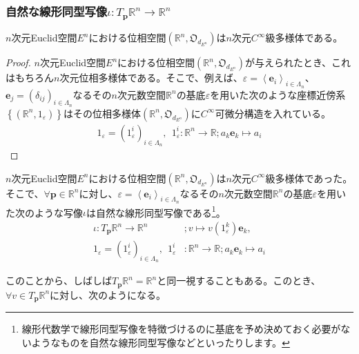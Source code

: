 \documentclass[dvipdfmx]{jsarticle}
\begin{document}
\subsubsection{自然な線形同型写像$\iota :T_{\mathbf{p}} \mathbb{R}^n \rightarrow \mathbb{R}^n $}
\begin{thm}\label{8.3.3.12}
  $n$次元Euclid空間$E^n$における位相空間$\left(\mathbb{R}^n ,\mathfrak{O}_{d_{E^n}}\right)$は$n$次元$C^\infty $級多様体である。
\end{thm}
\begin{proof}
  $n$次元Euclid空間$E^n$における位相空間$\left(\mathbb{R}^n ,\mathfrak{O}_{d_{E^n}}\right)$が与えられたとき、これはもちろん$n$次元位相多様体である。そこで、例えば、$\varepsilon =\left\langle \mathbf{e}_i \right\rangle_{i\in \varLambda_n } $、$\mathbf{e}_j =\left( \delta_{ij} \right)_{i\in \varLambda_n }$なるその$n$次元数空間$\mathbb{R}^n $の基底$\varepsilon$を用いた次のような座標近傍系$\left\{ \left(\mathbb{R}^n ,1_\varepsilon \right) \right\} $はその位相多様体$\left(\mathbb{R}^n ,\mathfrak{O}_{d_{E^n}}\right)$に$C^\infty $可微分構造を入れている。
  \begin{align*}
    1_\varepsilon =\left( 1_\varepsilon^i \right)_{i\in \varLambda_n },\ \ 1_\varepsilon^i :\mathbb{R}^n \rightarrow \mathbb{R} ;a_k \mathbf{e}_k \mapsto a_i 
  \end{align*}
\end{proof}
\begin{thm}\label{8.3.3.13}
  $n$次元Euclid空間$E^n$における位相空間$\left(\mathbb{R}^n ,\mathfrak{O}_{d_{E^n}}\right)$は$n$次元$C^\infty $級多様体であった。そこで、$\forall \mathbf{p} \in \mathbb{R}^n $に対し、$\varepsilon =\left\langle \mathbf{e}_i \right\rangle_{i\in \varLambda_n } $なるその$n$次元数空間$\mathbb{R}^n $の基底$\varepsilon$を用いた次のような写像$\iota $は自然な線形同型写像である\footnote{線形代数学で線形同型写像を特徴づけるのに基底を予め決めておく必要がないようなものを自然な線形同型写像などといったりします。}。
  \begin{align*}
    \iota :T_\mathbf{p} \mathbb{R}^n \rightarrow \mathbb{R}^n &;v\mapsto v\left(1_\varepsilon^k \right) \mathbf{e}_k ,\\
    1_\varepsilon =\left( 1_\varepsilon^i \right)_{i\in \varLambda_n },\ \ 1_\varepsilon^i &:\mathbb{R}^n \rightarrow \mathbb{R} ;a_k \mathbf{e}_k \mapsto a_i 
  \end{align*}
\end{thm}\par
このことから、しばしば$T_\mathbf{p} \mathbb{R}^n =\mathbb{R}^n $と同一視することもある。このとき、$\forall v\in T_\mathbf{p} \mathbb{R}^n $に対し、次のようになる。
\end{document}
